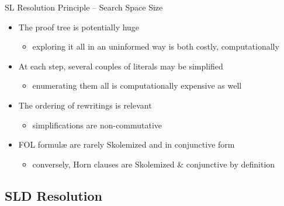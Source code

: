 \documentclass[presentation]{beamer}\mode<presentation>{\usetheme{AMSBolognaFC}}
\begin{document}
\begin{frame}{SL Resolution Principle -- Search Space Size}
    \begin{itemize}
        \item The proof tree is potentially \alert{huge}
        \begin{itemize}
            \item exploring it all in an \alert{uninformed} way is both costly, computationally
        \end{itemize}
        
        \vfill

        \item At each step, several couples of literals may be simplified
        \begin{itemize}
            \item enumerating them all is computationally expensive as well
        \end{itemize}
        
        \vfill

        \item The ordering of rewritings is \alert{relevant}
        \begin{itemize}
            \item simplifications are \alert{non-commutative}
        \end{itemize}

        \vfill

        \item FOL formul\ae{} are \alert{rarely} Skolemized and in \alert{conjunctive} form
        \begin{itemize}
            \item conversely, Horn clauses are Skolemized \& conjunctive \alert{by definition}
        \end{itemize}
    \end{itemize}
\end{frame}

\subsection{SLD Resolution}
\end{document}

